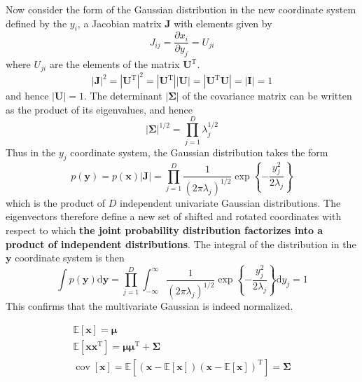 \documentclass[5p,sort&compress]{elsarticle}
\begin{document}
Now consider the form of the Gaussian distribution in the new coordinate system defined by the $y_i$, a Jacobian matrix $\mathbf{J}$ with elements given by
\begin{equation}
J_{i j}=\frac{\partial x_{i}}{\partial y_{j}}=U_{j i}
\end{equation}
where $U_{j i}$ are the elements of the matrix $\mathbf{U}^{\mathrm{T}}$.
\begin{equation}
|\mathbf{J}|^{2}=\left|\mathbf{U}^{\mathrm{T}}\right|^{2}=\left|\mathbf{U}^{\mathrm{T}}\right||\mathbf{U}|=\left|\mathbf{U}^{\mathrm{T}} \mathbf{U}\right|=|\mathbf{I}|=1
\end{equation}
and hence $|\mathbf{U}| = 1$. The determinant $|\mathbf{\Sigma}|$ of the covariance matrix can be written as the product of its eigenvalues, and hence
\begin{equation}
|\boldsymbol{\Sigma}|^{1 / 2}=\prod_{j=1}^{D} \lambda_{j}^{1 / 2}
\end{equation}
Thus in the $y_j$ coordinate system, the Gaussian distribution takes the form
\begin{equation}
p(\mathbf{y})=p(\mathbf{x})|\mathbf{J}|=\prod_{j=1}^{D} \frac{1}{\left(2 \pi \lambda_{j}\right)^{1 / 2}} \exp \left\{-\frac{y_{j}^{2}}{2 \lambda_{j}}\right\}
\end{equation}
which is the product of $D$ independent univariate Gaussian distributions. The eigenvectors therefore define a new set of shifted and rotated coordinates with respect to which \textbf{the joint probability distribution factorizes into a product of independent distributions}. The integral of the distribution in the $\boldsymbol{y}$ coordinate system is then
\begin{equation}
\int p(\mathbf{y}) \mathrm{d} \mathbf{y}=\prod_{j=1}^{D} \int_{-\infty}^{\infty} \frac{1}{\left(2 \pi \lambda_{j}\right)^{1 / 2}} \exp \left\{-\frac{y_{j}^{2}}{2 \lambda_{j}}\right\} \mathrm{d} y_{j}=1
\end{equation}
This confirms that the multivariate Gaussian is indeed normalized.

\begin{equation}
\begin{aligned}
\mathbb{E}[\mathbf{x}]=\boldsymbol{\mu} \\
\mathbb{E}\left[\mathbf{x} \mathbf{x}^{\mathrm{T}}\right]=\boldsymbol{\mu} \boldsymbol{\mu}^{\mathrm{T}}+\mathbf{\Sigma} \\
\operatorname{cov}[\mathbf{x}]=\mathbb{E}[(\mathbf{x}-\mathbb{E}[\mathbf{x}])(\mathbf{x}-\mathbb{E}[\mathbf{x}])^{\mathrm{T}}] = \mathbf{\Sigma}
\end{aligned}
\end{equation}
\end{document}
